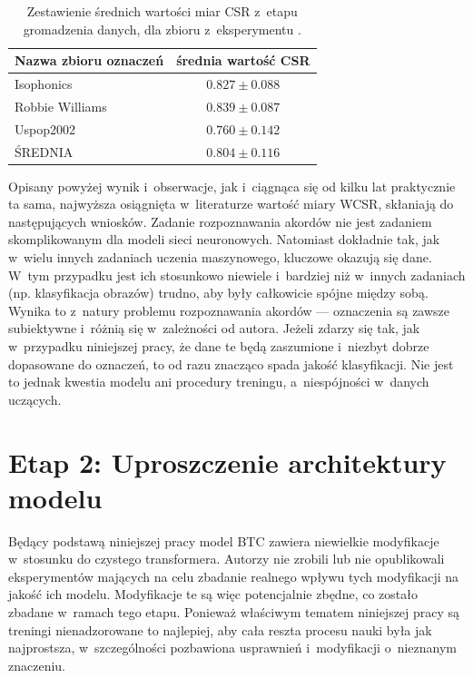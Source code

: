 \begin{table}
    \centering
    \caption{Zestawienie średnich wartości miar CSR z~etapu gromadzenia danych, dla zbioru z~eksperymentu .}
    \label{tab:results_btc-reproduce_extra}
    \begin{tabular}{|l|c|}
        \hline Nazwa zbioru oznaczeń & średnia wartość CSR \\ \hline
        Isophonics  & $0.827 \pm 0.088$ \\
        Robbie Williams & $0.839 \pm 0.087$ \\
        Uspop2002 & $0.760 \pm 0.142$ \\
        \hline ŚREDNIA & $0.804 \pm 0.116$ \\ \hline
    \end{tabular}
\end{table}

Opisany powyżej wynik i~obserwacje, jak i~ciągnąca się od kilku lat praktycznie ta sama, najwyższa osiągnięta w~literaturze wartość miary WCSR, skłaniają do następujących wniosków. Zadanie rozpoznawania akordów nie jest zadaniem skomplikowanym dla modeli sieci neuronowych. Natomiast dokładnie tak, jak w~wielu innych zadaniach uczenia maszynowego, kluczowe okazują się dane. W~tym przypadku jest ich stosunkowo niewiele i~bardziej niż w~innych zadaniach (np. klasyfikacja obrazów) trudno, aby były całkowicie spójne między sobą. Wynika to z~natury problemu rozpoznawania akordów --- oznaczenia są zawsze subiektywne i~różnią się w~zależności od autora. Jeżeli zdarzy się tak, jak w~przypadku niniejszej pracy, że dane te będą zaszumione i~niezbyt dobrze dopasowane do oznaczeń, to od razu znacząco spada jakość klasyfikacji. Nie jest to jednak kwestia modelu ani procedury treningu, a~niespójności w~danych uczących.



\section{Etap 2: Uproszczenie architektury modelu}

Będący podstawą niniejszej pracy model BTC zawiera niewielkie modyfikacje w~stosunku do czystego transformera. Autorzy nie zrobili lub nie opublikowali eksperymentów mających na celu zbadanie realnego wpływu tych modyfikacji na jakość ich modelu. Modyfikacje te są więc potencjalnie zbędne, co zostało zbadane w~ramach tego etapu. Ponieważ właściwym tematem niniejszej pracy są treningi nienadzorowane to najlepiej, aby cała reszta procesu nauki była jak najprostsza, w~szczególności pozbawiona usprawnień i~modyfikacji o~nieznanym znaczeniu.

